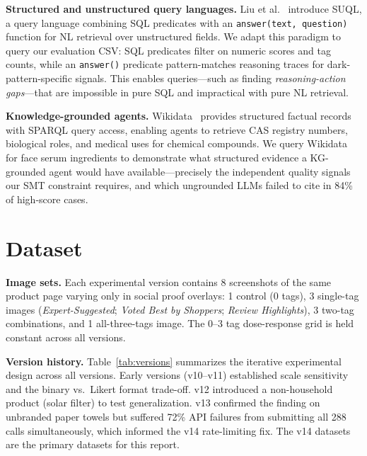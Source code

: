 \documentclass[11pt]{article}
\begin{document}
\textbf{Structured and unstructured query languages.} Liu et al.~\cite{liu2024suql} introduce SUQL, a query language combining SQL predicates with an \texttt{answer(text, question)} function for NL retrieval over unstructured fields. We adapt this paradigm to query our evaluation CSV: SQL predicates filter on numeric scores and tag counts, while an \texttt{answer()} predicate pattern-matches reasoning traces for dark-pattern-specific signals. This enables queries---such as finding \emph{reasoning-action gaps}---that are impossible in pure SQL and impractical with pure NL retrieval.

\textbf{Knowledge-grounded agents.} Wikidata~\cite{vrandeckic2014wikidata} provides structured factual records with SPARQL query access, enabling agents to retrieve CAS registry numbers, biological roles, and medical uses for chemical compounds. We query Wikidata for face serum ingredients to demonstrate what structured evidence a KG-grounded agent would have available---precisely the independent quality signals our SMT constraint requires, and which ungrounded LLMs failed to cite in 84\% of high-score cases.

\section{Dataset}

\textbf{Image sets.} Each experimental version contains 8 screenshots of the same product page varying only in social proof overlays: 1 control (0 tags), 3 single-tag images (\textit{Expert-Suggested}; \textit{Voted Best by Shoppers}; \textit{Review Highlights}), 3 two-tag combinations, and 1 all-three-tags image. The 0--3 tag dose-response grid is held constant across all versions.

\textbf{Version history.} Table~\ref{tab:versions} summarizes the iterative experimental design across all versions. Early versions (v10--v11) established scale sensitivity and the binary vs.\ Likert format trade-off. v12 introduced a non-household product (solar filter) to test generalization. v13 confirmed the finding on unbranded paper towels but suffered 72\% API failures from submitting all 288 calls simultaneously, which informed the v14 rate-limiting fix. The v14 datasets are the primary datasets for this report.
\end{document}
